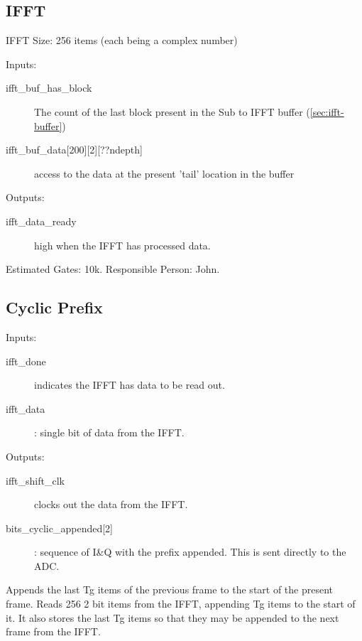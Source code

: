 \documentclass[dvips,10pt,twocolumn]{article}
\begin{document}
	\subsection{IFFT}
	\label{sec:ifft}
	IFFT Size: 256 items (each being a complex number)
	\begin{description}
		\item{Inputs:}
		\begin{description}
			\item[ifft\_buf\_has\_block] The count of the last
				block present in the Sub to IFFT buffer
				(\autoref{sec:ifft-buffer})
			
			\item[ifft\_buf\_data{[200][2][??ndepth]}] access
				to the data at the present 'tail' location
				in the buffer
		\end{description}
		
		\item{Outputs:}
		\begin{description}
			\item[ifft\_data\_ready] high when the IFFT has
				processed data.
		\end{description}
	\end{description}

	Estimated Gates: 10k.
	Responsible Person: John.

	\subsection{Cyclic Prefix}
	\label{sec:cyclic_prefix}
	\begin{description}
		\item{Inputs:}
		\begin{description}
			\item[ifft\_done] indicates the IFFT has
				data to be read out.
			\item[ifft\_data] : single bit of data from
				the IFFT.
		\end{description}
		\item{Outputs:}
		\begin{description}
			\item[ifft\_shift\_clk] clocks out the data from the IFFT.
			\item[bits\_cyclic\_appended{[2]}]: sequence of
				I\&Q with the prefix appended.
				This is sent directly to the ADC.
		\end{description}
	\end{description}

	Appends the last Tg items of the previous frame to the start of the
	present frame.  Reads 256 2 bit items from the IFFT, appending Tg
	items to the start of it. It also stores the last Tg items so that
	they may be appended to the next frame from the IFFT.
\end{document}
